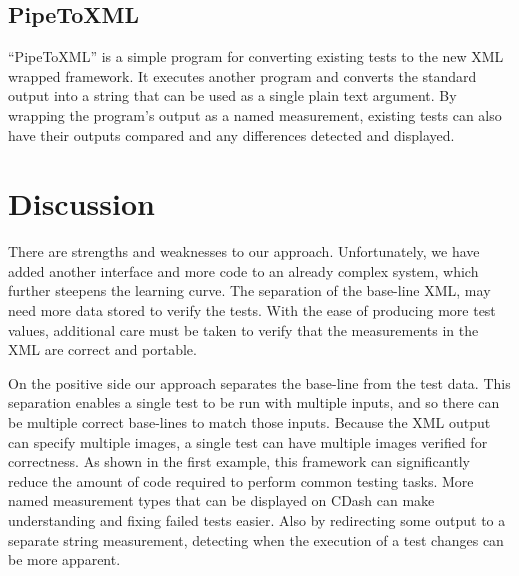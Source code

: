 \documentclass{InsightArticle}
\begin{document}
\subsection{PipeToXML}

``PipeToXML'' is a simple program for converting existing tests to the new XML wrapped framework. It executes another program and converts the standard output into a string that can be used as a single plain text argument. By wrapping the program's output as a named measurement, existing tests can also have their outputs compared and any differences detected and displayed.

\section{Discussion}


There are strengths and weaknesses to our approach. Unfortunately, we have added another interface and more code to an already complex system, which further steepens the learning curve. The separation of the base-line XML, may need more data stored to verify the tests. With the ease of producing more test values, additional care must be taken to verify that the measurements in the XML are correct and portable.

On the positive side our approach separates the base-line from the test data. This separation enables a single test to be run with multiple inputs, and so there can be multiple correct base-lines to match those inputs. Because the XML output can specify multiple images, a single test can have multiple images verified for correctness. As shown in the first example, this framework can significantly reduce the amount of code required to perform common testing tasks. More named measurement types that can be displayed on CDash can make understanding and fixing failed tests easier. Also by redirecting some output to a separate string measurement, detecting when the execution of a test changes can be more apparent.






%
%



\end{document}
